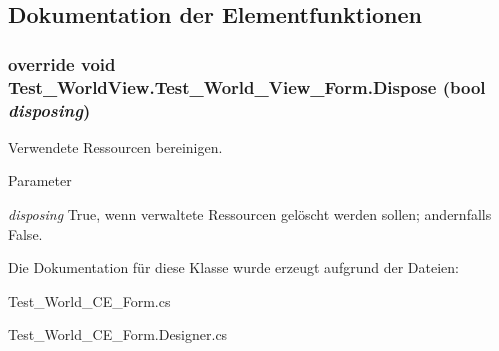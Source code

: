 \subsection{Dokumentation der Elementfunktionen}
\hypertarget{class_test___world_view_1_1_test___world___view___form_a58c32471c42109624080524e42837cf0}{
\subsubsection[{Dispose}]{\setlength{\rightskip}{0pt plus 5cm}override void Test\_\-WorldView.Test\_\-World\_\-View\_\-Form.Dispose (bool {\em disposing})}}
\label{class_test___world_view_1_1_test___world___view___form_a58c32471c42109624080524e42837cf0}


Verwendete Ressourcen bereinigen. 


\begin{DoxyParams}{Parameter}
\item[{\em disposing}]True, wenn verwaltete Ressourcen gelöscht werden sollen; andernfalls False.\end{DoxyParams}


Die Dokumentation für diese Klasse wurde erzeugt aufgrund der Dateien:\begin{DoxyCompactItemize}
\item 
Test\_\-World\_\-CE\_\-Form.cs\item 
Test\_\-World\_\-CE\_\-Form.Designer.cs\end{DoxyCompactItemize}
